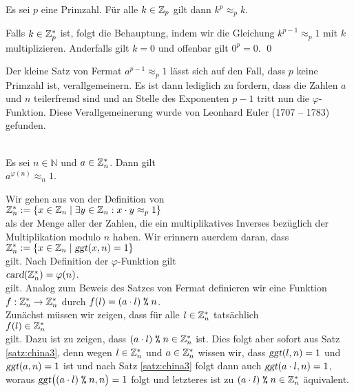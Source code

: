 \begin{Korollar}
  Es sei $p$ eine Primzahl.  F\"{u}r alle $k \in \mathbb{Z}_{p}$ gilt dann $k^p \approx_p k$.
\end{Korollar}

\proof
Falls $k \in \mathbb{Z}_{p}^*$ ist, folgt die Behauptung, indem wir die Gleichung $k^{p-1} \approx_p 1$
mit $k$ multiplizieren.  Anderfalls gilt $k= 0$ und offenbar gilt $0^p = 0$. \qed
\vspace*{0.3cm}

Der kleine Satz von Fermat $a^{p-1} \approx_p 1$ l\"{a}sst sich auf den Fall, dass $p$ keine Primzahl ist,
verallgemeinern.  Es ist dann lediglich zu fordern, dass die Zahlen $a$ und $n$ teilerfremd sind und an
Stelle des Exponenten $p - 1$ tritt nun die $\varphi$-Funktion.   Diese Verallgemeinerung wurde von Leonhard
Euler (1707 -- 1783) gefunden.


\begin{Satz} \hspace*{\fill} \\ 
Es sei $n \in \mathbb{N}$ und  $a \in \mathbb{Z}_{n}^*$. Dann gilt
\\[0.2cm]
\hspace*{1.3cm}
$a^{\varphi(n)} \approx_n 1$.  
\end{Satz}

\proof
Wir gehen aus von der Definition von
\\[0.2cm]
\hspace*{1.3cm}
$\mathbb{Z}_{n}^* := \{ x \in \mathbb{Z}_{n} \mid \exists y \in \mathbb{Z}_{n} : x \cdot y \approx_p 1 \}$
\\[0.2cm]
als der Menge aller der Zahlen, die ein multiplikatives Inverses bez\"{u}glich der Multiplikation modulo $n$
haben.  Wir erinnern au\3erdem daran, dass
\\[0.2cm]
\hspace*{1.3cm}
$\mathbb{Z}_{n}^* := \{ x \in \mathbb{Z}_{n} \mid \textsl{ggt}(x, n) = 1 \}$
\\[0.2cm]
gilt.  Nach Definition der $\varphi$-Funktion gilt
\\[0.2cm]
\hspace*{1.3cm}
$\textsl{card}(\mathbb{Z}_{n}^*) = \varphi(n)$.
\\[0.2cm]
gilt.  Analog zum Beweis des Satzes von Fermat definieren wir eine Funktion
\\[0.2cm]
\hspace*{1.3cm}
$f: \mathbb{Z}_{n}^* \rightarrow \mathbb{Z}_{n}^*$ \quad durch \quad $f(l) = (a \cdot l) \;\texttt{\%}\; n$.
\\[0.2cm]
Zun\"{a}chst m\"{u}ssen wir zeigen, dass f\"{u}r alle $l \in \mathbb{Z}_{n}^*$ tats\"{a}chlich 
\\[0.2cm]
\hspace*{1.3cm}
$f(l) \in \mathbb{Z}_{n}^*$
\\[0.2cm]
gilt.  Dazu ist zu zeigen, dass $(a \cdot l) \;\texttt{\%}\; n \in \mathbb{Z}_{n}^*$ ist.  
Dies folgt aber sofort aus Satz \ref{satz:china3}, denn
wegen $l \in \mathbb{Z}_{n}^*$ und $a \in \mathbb{Z}_{n}^*$ wissen wir, dass $\textsl{ggt}(l,n) = 1$ und
$\textsl{ggt}(a,n) = 1$ ist und nach Satz \ref{satz:china3} folgt dann auch 
$\textsl{ggt}(a \cdot l, n) = 1$, woraus $\textsl{ggt}\bigl((a \cdot l) \;\texttt{\%}\; n, n\bigr) = 1$
folgt und letzteres ist zu $(a \cdot l) \;\texttt{\%}\; n \in \mathbb{Z}_{n}^*$ \"{a}quivalent.


